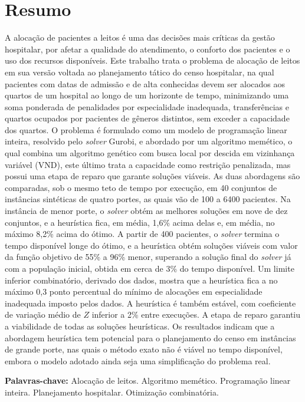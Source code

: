 \chapter*{Resumo}

A alocação de pacientes a leitos é uma das decisões mais críticas da gestão hospitalar, por afetar a qualidade do atendimento, o conforto dos pacientes e o uso dos recursos disponíveis. Este trabalho trata o problema de alocação de leitos em sua versão voltada ao planejamento tático do censo hospitalar, na qual pacientes com datas de admissão e de alta conhecidas devem ser alocados aos quartos de um hospital ao longo de um horizonte de tempo, minimizando uma soma ponderada de penalidades por especialidade inadequada, transferências e quartos ocupados por pacientes de gêneros distintos, sem exceder a capacidade dos quartos. O problema é formulado como um modelo de programação linear inteira, resolvido pelo \textit{solver} Gurobi, e abordado por um algoritmo memético, o qual combina um algoritmo genético com busca local por descida em vizinhança variável (VND), este último trata a capacidade como restrição penalizada, mas possui uma etapa de reparo que garante soluções viáveis. As duas abordagens são comparadas, sob o mesmo teto de tempo por execução, em 40 conjuntos de instâncias sintéticas de quatro portes, as quais vão de 100 a 6400 pacientes. Na instância de menor porte, o \textit{solver} obtém as melhores soluções em nove de dez conjuntos, e a heurística fica, em média, 1,6\% acima delas e, em média, no máximo 8,2\% acima do ótimo. A partir de 400 pacientes, o \textit{solver} termina o tempo disponível longe do ótimo, e a heurística obtém soluções viáveis com valor da função objetivo de 55\% a 96\% menor, superando a solução final do \textit{solver} já com a população inicial, obtida em cerca de 3\% do tempo disponível. Um limite inferior combinatório, derivado dos dados, mostra que a heurística fica a no máximo 0,3 ponto percentual do mínimo de alocações em especialidade inadequada imposto pelos dados. A heurística é também estável, com coeficiente de variação médio de $Z$ inferior a 2\% entre execuções. A etapa de reparo garantiu a viabilidade de todas as soluções heurísticas. Os resultados indicam que a abordagem heurística tem potencial para o planejamento do censo em instâncias de grande porte, nas quais o método exato não é viável no tempo disponível, embora o modelo adotado ainda seja uma simplificação do problema real.

\vspace{0.5cm}
\noindent\textbf{Palavras-chave:} Alocação de leitos. Algoritmo memético. Programação linear inteira. Planejamento hospitalar. Otimização combinatória.

